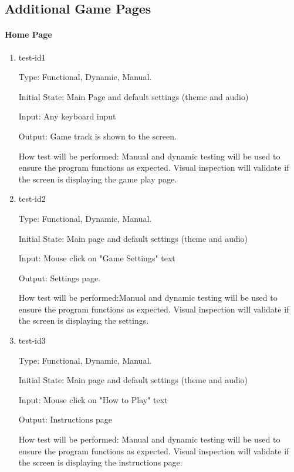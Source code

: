 \documentclass[12pt, titlepage]{article}
\begin{document}
	
	\subsection{Additional Game Pages}
	
	
	
	\paragraph{Home Page}
	
	\begin{enumerate}
		
		\item{test-id1\\}
		
		Type: Functional, Dynamic, Manual. 
		
		Initial State: Main Page and default settings (theme and audio)
		
		Input: Any keyboard input 
		
		Output: Game track is shown to the screen. 
		
		How test will be performed: Manual and dynamic testing will be used to ensure the program functions as expected. Visual inspection will validate if the screen is displaying the game play page. 
		
		\item{test-id2\\}
		
		Type: Functional, Dynamic, Manual.
		
		Initial State: Main page and default settings (theme and audio) 
		
		Input: Mouse click on "Game Settings" text
		
		Output: Settings page. 
		
		How test will be performed:Manual and dynamic testing will be used to ensure the program functions as expected. Visual inspection will validate if the screen is displaying the settings.  
		
		\item{test-id3\\}
		
		Type: Functional, Dynamic, Manual.
		
		Initial State: Main page and default settings (theme and audio) 
		
		Input: Mouse click on "How to Play" text
		
		Output: Instructions page
		
		How test will be performed: Manual and dynamic testing will be used to ensure the program functions as expected. Visual inspection will validate if the screen is displaying the instructions page. 
		
	\end{enumerate}
	
\end{document}
